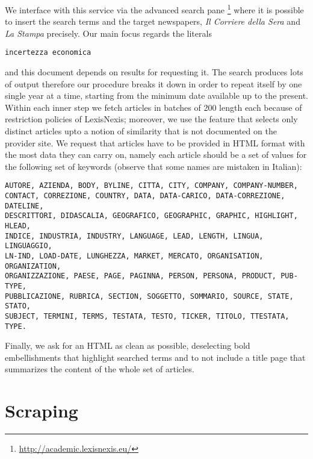 \documentclass[a4paper]{article}
\begin{document}
We interface with this service via the advanced search pane
\footnote{\url{http://academic.lexisnexis.eu/}} where it is possible to insert
the search terms and the target newspapers, \emph{Il Corriere della Sera} and
\emph{La Stampa} precisely. Our main focus regards the literals
\begin{Verbatim}
incertezza economica
\end{Verbatim}
and this document depends on results for requesting it. The search produces
lots of output therefore our procedure breaks it down in order to repeat itself
by one single year at a time, starting from the minimum date available up to
the present. Within each inner step we fetch articles in batches of 200 length
each because of restriction policies of LexisNexis; moreover, we use the
feature that selects only distinct articles upto a notion of similarity that is
not documented on the provider site. We request that articles have to be
provided in HTML format with the most data they can carry on, namely each
article should be a set of values for the following set of keywords 
(observe that some names are mistaken in Italian):
\begin{Verbatim}[fontsize=\footnotesize]
AUTORE, AZIENDA, BODY, BYLINE, CITTA, CITY, COMPANY, COMPANY-NUMBER,
CONTACT, CORREZIONE, COUNTRY, DATA, DATA-CARICO, DATA-CORREZIONE, DATELINE,
DESCRITTORI, DIDASCALIA, GEOGRAFICO, GEOGRAPHIC, GRAPHIC, HIGHLIGHT, HLEAD,
INDICE, INDUSTRIA, INDUSTRY, LANGUAGE, LEAD, LENGTH, LINGUA, LINGUAGGIO,
LN-IND, LOAD-DATE, LUNGHEZZA, MARKET, MERCATO, ORGANISATION, ORGANIZATION,
ORGANIZZAZIONE, PAESE, PAGE, PAGINNA, PERSON, PERSONA, PRODUCT, PUB-TYPE,
PUBBLICAZIONE, RUBRICA, SECTION, SOGGETTO, SOMMARIO, SOURCE, STATE, STATO,
SUBJECT, TERMINI, TERMS, TESTATA, TESTO, TICKER, TITOLO, TTESTATA, TYPE.
\end{Verbatim}

Finally, we ask for an HTML as clean as possible, deselecting bold
embellishments that highlight searched terms and to not include a title page
that summarizes the content of the whole set of articles.

\section{Scraping}
\end{document}
